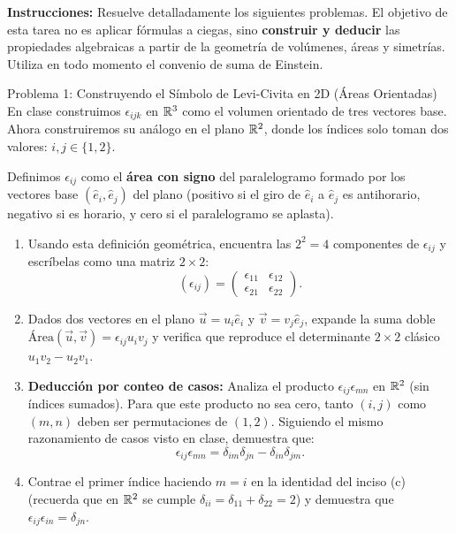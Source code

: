 \documentclass[11pt,letterpaper]{article}
\begin{document}
\setlength{\abovedisplayskip}{6pt}
\setlength{\belowdisplayskip}{6pt}
\setlength{\textfloatsep}{10pt}
\setlength{\intextsep}{8pt}
\color{blackmain}


\noindent\textbf{Instrucciones:} Resuelve detalladamente los siguientes problemas. El objetivo de esta tarea no es aplicar fórmulas a ciegas, sino \textbf{construir y deducir} las propiedades algebraicas a partir de la geometría de volúmenes, áreas y simetrías. Utiliza en todo momento el convenio de suma de Einstein.


\begin{infobox}{Problema 1: Construyendo el Símbolo de Levi-Civita en 2D (Áreas Orientadas)}
En clase construimos $\epsilon_{ijk}$ en $\mathbb{R}^3$ como el volumen orientado de tres vectores base. Ahora construiremos su análogo en el plano $\mathbb{R}^2$, donde los índices solo toman dos valores: $i, j \in \{1, 2\}$.

Definimos $\epsilon_{ij}$ como el \textbf{área con signo} del paralelogramo formado por los vectores base $(\hat{e}_i, \hat{e}_j)$ del plano (positivo si el giro de $\hat{e}_i$ a $\hat{e}_j$ es antihorario, negativo si es horario, y cero si el paralelogramo se aplasta).
\begin{enumerate}[label=(\alph*)]
    \item Usando esta definición geométrica, encuentra las $2^2 = 4$ componentes de $\epsilon_{ij}$ y escríbelas como una matriz $2 \times 2$:
    \[
    (\epsilon_{ij}) = \begin{pmatrix} \epsilon_{11} & \epsilon_{12} \\ \epsilon_{21} & \epsilon_{22} \end{pmatrix}.
    \]
    \item Dados dos vectores en el plano $\vec{u} = u_i\hat{e}_i$ y $\vec{v} = v_j\hat{e}_j$, expande la suma doble $\text{Área}(\vec{u}, \vec{v}) = \epsilon_{ij} u_i v_j$ y verifica que reproduce el determinante $2 \times 2$ clásico $u_1 v_2 - u_2 v_1$.
    \item \textbf{Deducción por conteo de casos:} Analiza el producto $\epsilon_{ij}\epsilon_{mn}$ en $\mathbb{R}^2$ (sin índices sumados). Para que este producto no sea cero, tanto $(i,j)$ como $(m,n)$ deben ser permutaciones de $(1,2)$. Siguiendo el mismo razonamiento de casos visto en clase, demuestra que:
    \[
    \epsilon_{ij}\epsilon_{mn} = \delta_{im}\delta_{jn} - \delta_{in}\delta_{jm}.
    \]
    \item Contrae el primer índice haciendo $m = i$ en la identidad del inciso (c) (recuerda que en $\mathbb{R}^2$ se cumple $\delta_{ii} = \delta_{11} + \delta_{22} = 2$) y demuestra que $\epsilon_{ij}\epsilon_{in} = \delta_{jn}$.
\end{enumerate}
\end{infobox}
\end{document}
